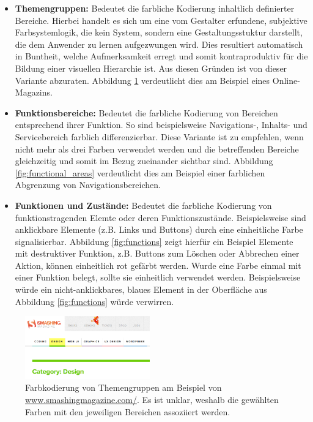 \begin{itemize}
	\item \textbf{Themengruppen:} Bedeutet die farbliche Kodierung inhaltlich definierter Bereiche. Hierbei handelt es sich um eine vom Gestalter erfundene, subjektive Farbsystemlogik, die kein System, sondern eine Gestaltungsstuktur darstellt, die dem Anwender zu lernen aufgezwungen wird. Dies resultiert automatisch in Buntheit, welche Aufmerksamkeit erregt und somit kontraproduktiv für die Bildung einer visuellen Hierarchie ist. Aus diesen Gründen ist von dieser Variante abzuraten. Abbildung \ref{fig:theme_coding} verdeutlicht dies am Beispiel eines Online-Magazins.
	\item \textbf{Funktionsbereiche:} Bedeutet die farbliche Kodierung von Bereichen entsprechend ihrer Funktion. So sind beispielsweise Navigations-, Inhalts- und Servicebereich farblich differenzierbar. Diese Variante ist zu empfehlen, wenn nicht mehr als drei Farben verwendet werden und die betreffenden Bereiche gleichzeitig und somit im Bezug zueinander sichtbar sind. Abbildung \ref{fig:functional_areas} verdeutlicht dies am Beispiel einer farblichen Abgrenzung von Navigationsbereichen.
	\item \textbf{Funktionen und Zustände:} Bedeutet die farbliche Kodierung von funktionstragenden Elemte oder deren Funktionszustände. Beispielsweise sind anklickbare Elemente (z.B. Links und Buttons) durch eine einheitliche Farbe signalisierbar. Abbildung \ref{fig:functions} zeigt hierfür ein Beispiel Elemente mit destruktiver Funktion, z.B. Buttons zum Löschen oder Abbrechen einer Aktion, können einheitlich rot gefärbt werden. Wurde eine Farbe einmal mit einer Funktion belegt, sollte sie einheitlich verwendet werden. Beispielsweise würde ein nicht-anklickbares, blaues Element in der Oberfläche aus Abbildung \ref{fig:functions} würde verwirren.
\end{itemize}

\begin{figure}[h]
	\centering
	\includegraphics[width=0.48\textwidth]{img/theme_coding.png}
	\caption{Farbkodierung von Themengruppen am Beispiel von \url{www.smashingmagazine.com/}. Es ist unklar, weshalb die gewählten Farben mit den jeweiligen Bereichen assoziiert werden.}
	\label{fig:theme_coding}
\end{figure}

